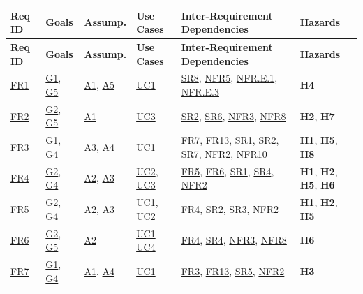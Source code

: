 \documentclass[11pt]{article}
\begin{document}
{\footnotesize
\begin{tabularx}{\textwidth}{P{1.15cm} P{1.45cm} P{1.45cm} P{1.55cm} Y P{2.1cm}}
\caption{Complete Bidirectional Traceability Matrix} \label{TblTraceabilityMatrix}\\
\toprule
\textbf{Req ID} & \textbf{Goals} & \textbf{Assump.} & \textbf{Use Cases} & \textbf{Inter-Requirement Dependencies} & \textbf{Hazards}\\
\midrule
\endfirsthead
\toprule
\textbf{Req ID} & \textbf{Goals} & \textbf{Assump.} & \textbf{Use Cases} & \textbf{Inter-Requirement Dependencies} & \textbf{Hazards}\\
\midrule
\endhead
\bottomrule
\endfoot
\hyperref[FR1]{FR1} & \hyperref[G1]{G1}, \hyperref[G5]{G5} & \hyperref[A1]{A1}, \hyperref[A5]{A5} & \hyperref[UC1]{UC1} & \hyperref[SR8]{SR8}, \hyperref[NFR5]{NFR5}, \hyperref[NFR.E.1]{NFR.E.1}, \hyperref[NFR.E.3]{NFR.E.3} & \textbf{H4}\\
\hyperref[FR2]{FR2} & \hyperref[G2]{G2}, \hyperref[G5]{G5} & \hyperref[A1]{A1} & \hyperref[UC3]{UC3} & \hyperref[SR2]{SR2}, \hyperref[SR6]{SR6}, \hyperref[NFR3]{NFR3}, \hyperref[NFR8]{NFR8} & \textbf{H2}, \textbf{H7}\\
\hyperref[FR3]{FR3} & \hyperref[G1]{G1}, \hyperref[G4]{G4} & \hyperref[A3]{A3}, \hyperref[A4]{A4} & \hyperref[UC1]{UC1} & \hyperref[FR7]{FR7}, \hyperref[FR13]{FR13}, \hyperref[SR1]{SR1}, \hyperref[SR2]{SR2}, \hyperref[SR7]{SR7}, \hyperref[NFR2]{NFR2}, \hyperref[NFR10]{NFR10} & \textbf{H1}, \textbf{H5}, \textbf{H8}\\
\hyperref[FR4]{FR4} & \hyperref[G2]{G2}, \hyperref[G4]{G4} & \hyperref[A2]{A2}, \hyperref[A3]{A3} & \hyperref[UC2]{UC2}, \hyperref[UC3]{UC3} & \hyperref[FR5]{FR5}, \hyperref[FR6]{FR6}, \hyperref[SR1]{SR1}, \hyperref[SR4]{SR4}, \hyperref[NFR2]{NFR2} & \textbf{H1}, \textbf{H2}, \textbf{H5}, \textbf{H6}\\
\hyperref[FR5]{FR5} & \hyperref[G2]{G2}, \hyperref[G4]{G4} & \hyperref[A2]{A2}, \hyperref[A3]{A3} & \hyperref[UC1]{UC1}, \hyperref[UC2]{UC2} & \hyperref[FR4]{FR4}, \hyperref[SR2]{SR2}, \hyperref[SR3]{SR3}, \hyperref[NFR2]{NFR2} & \textbf{H1}, \textbf{H2}, \textbf{H5}\\
\hyperref[FR6]{FR6} & \hyperref[G2]{G2}, \hyperref[G5]{G5} & \hyperref[A2]{A2} & \hyperref[UC1]{UC1}--\hyperref[UC4]{UC4} & \hyperref[FR4]{FR4}, \hyperref[SR4]{SR4}, \hyperref[NFR3]{NFR3}, \hyperref[NFR8]{NFR8} & \textbf{H6}\\
\hyperref[FR7]{FR7} & \hyperref[G1]{G1}, \hyperref[G4]{G4} & \hyperref[A1]{A1}, \hyperref[A4]{A4} & \hyperref[UC1]{UC1} & \hyperref[FR3]{FR3}, \hyperref[FR13]{FR13}, \hyperref[SR5]{SR5}, \hyperref[NFR2]{NFR2} & \textbf{H3}\\

\end{tabularx}}
\end{document}
